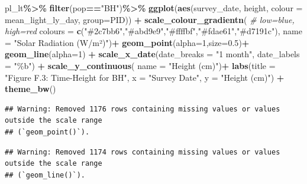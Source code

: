 \documentclass[
]{article}
\newenvironment{Shaded}{\begin{snugshade}}{\end{snugshade}}
\newcommand{\AttributeTok}[1]{\textcolor[rgb]{0.13,0.29,0.53}{#1}}
\newcommand{\CommentTok}[1]{\textcolor[rgb]{0.56,0.35,0.01}{\textit{#1}}}
\newcommand{\DecValTok}[1]{\textcolor[rgb]{0.00,0.00,0.81}{#1}}
\newcommand{\FloatTok}[1]{\textcolor[rgb]{0.00,0.00,0.81}{#1}}
\newcommand{\FunctionTok}[1]{\textcolor[rgb]{0.13,0.29,0.53}{\textbf{#1}}}
\newcommand{\NormalTok}[1]{#1}
\newcommand{\SpecialCharTok}[1]{\textcolor[rgb]{0.81,0.36,0.00}{\textbf{#1}}}
\newcommand{\StringTok}[1]{\textcolor[rgb]{0.31,0.60,0.02}{#1}}
\begin{document}
\begin{Shaded}
\begin{Highlighting}[]
\NormalTok{pl\_lt}\SpecialCharTok{\%\textgreater{}\%}
  \FunctionTok{filter}\NormalTok{(pop}\SpecialCharTok{==}\StringTok{"BH"}\NormalTok{)}\SpecialCharTok{\%\textgreater{}\%}
  \FunctionTok{ggplot}\NormalTok{(}\FunctionTok{aes}\NormalTok{(survey\_date, height, }\AttributeTok{colour =}\NormalTok{ mean\_light\_ly\_day, }\AttributeTok{group=}\NormalTok{PID)) }\SpecialCharTok{+}
  \FunctionTok{scale\_colour\_gradientn}\NormalTok{(                         }\CommentTok{\# low=blue, high=red}
    \AttributeTok{colours =} \FunctionTok{c}\NormalTok{(}\StringTok{"\#2c7bb6"}\NormalTok{,}\StringTok{"\#abd9e9"}\NormalTok{,}\StringTok{"\#ffffbf"}\NormalTok{,}\StringTok{"\#fdae61"}\NormalTok{,}\StringTok{"\#d7191c"}\NormalTok{),}
    \AttributeTok{name =} \StringTok{"Solar Radiation (W/m²)"}\NormalTok{)}\SpecialCharTok{+}
  \FunctionTok{geom\_point}\NormalTok{(}\AttributeTok{alpha=}\DecValTok{1}\NormalTok{,}\AttributeTok{size=}\FloatTok{0.5}\NormalTok{)}\SpecialCharTok{+}
  \FunctionTok{geom\_line}\NormalTok{(}\AttributeTok{alpha=}\DecValTok{1}\NormalTok{) }\SpecialCharTok{+}
  \FunctionTok{scale\_x\_date}\NormalTok{(}\AttributeTok{date\_breaks =} \StringTok{"1 month"}\NormalTok{, }\AttributeTok{date\_labels =} \StringTok{"\%b"}\NormalTok{) }\SpecialCharTok{+}
   \FunctionTok{scale\_y\_continuous}\NormalTok{(}
    \AttributeTok{name =} \StringTok{"Height (cm)"}\NormalTok{)}\SpecialCharTok{+}
  \FunctionTok{labs}\NormalTok{(}\AttributeTok{title =} \StringTok{"Figure F.3: Time{-}Height for BH"}\NormalTok{,}
       \AttributeTok{x =} \StringTok{"Survey Date"}\NormalTok{,}
       \AttributeTok{y =} \StringTok{"Height (cm)"}\NormalTok{) }\SpecialCharTok{+}
  \FunctionTok{theme\_bw}\NormalTok{()}
\end{Highlighting}
\end{Shaded}

\begin{verbatim}
## Warning: Removed 1176 rows containing missing values or values outside the scale range
## (`geom_point()`).
\end{verbatim}

\begin{verbatim}
## Warning: Removed 1174 rows containing missing values or values outside the scale range
## (`geom_line()`).
\end{verbatim}
\end{document}
